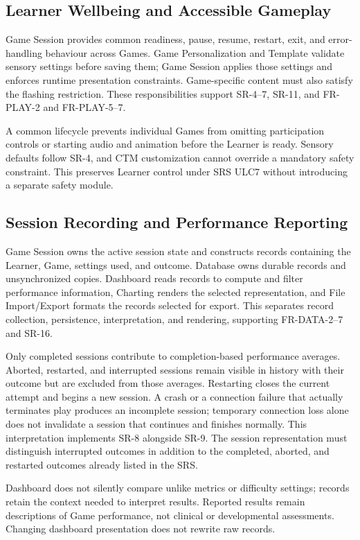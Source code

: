 \documentclass[12pt, titlepage]{article}
\begin{document}
\subsection*{Learner Wellbeing and Accessible Gameplay}

Game Session provides common readiness, pause, resume, restart, exit, and
error-handling behaviour across Games. Game Personalization and Template
validate sensory settings before saving them; Game Session applies those
settings and enforces runtime presentation constraints. Game-specific
content must also satisfy the flashing restriction. These responsibilities
support SR-4--7, SR-11, and FR-PLAY-2 and FR-PLAY-5--7.

A common lifecycle prevents individual Games from omitting participation
controls or starting audio and animation before the Learner is ready.
Sensory defaults follow SR-4, and CTM customization cannot override a
mandatory safety constraint. This preserves Learner control under SRS ULC7
without introducing a separate safety module.

\subsection*{Session Recording and Performance Reporting}

Game Session owns the active session state and constructs records containing
the Learner, Game, settings used, and outcome. Database owns durable records
and unsynchronized copies. Dashboard reads records to compute and filter
performance information, Charting renders the selected representation, and
File Import/Export formats the records selected for export. This separates
record collection, persistence, interpretation, and rendering, supporting
FR-DATA-2--7 and SR-16.

Only completed sessions contribute to completion-based performance averages.
Aborted, restarted, and interrupted sessions remain visible in history with
their outcome but are excluded from those averages. Restarting closes the
current attempt and begins a new session. A crash or a connection failure
that actually terminates play produces an incomplete session; temporary
connection loss alone does not invalidate a session that continues and
finishes normally. This interpretation implements SR-8 alongside SR-9.
The session representation must distinguish interrupted outcomes in addition
to the completed, aborted, and restarted outcomes already listed in the SRS.

Dashboard does not silently compare unlike metrics or difficulty settings;
records retain the context needed to interpret results. Reported results
remain descriptions of Game performance, not clinical or developmental
assessments. Changing dashboard presentation does not rewrite raw records.
\end{document}
